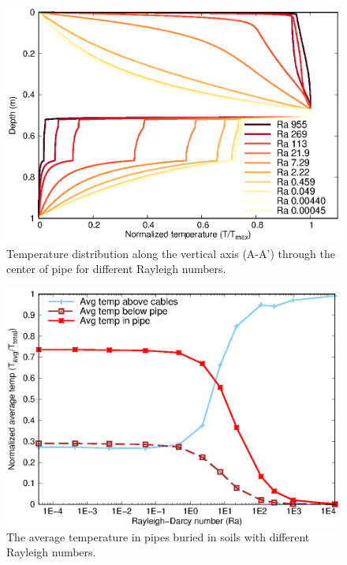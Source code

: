 \documentclass[Journal,letterpaper,InsideFigs]{ascelike-new}
\begin{document}
\begin{figure}
    \centering
    \includegraphics{figs/temp-pipe.eps}
    \caption{Temperature distribution along the vertical axis (A-A’) through the center of pipe for different Rayleigh numbers.}
    \label{fig:ra-vline}
\end{figure}

\begin{figure}
    \centering
    \includegraphics{figs/heat-pipe.eps}
    \caption{The average temperature in pipes buried in soils with different Rayleigh numbers.}
    \label{fig:heat-pipe}
\end{figure}
\end{document}
